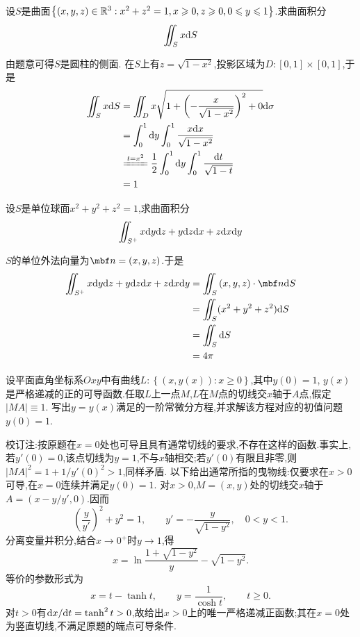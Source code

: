 \documentclass{ctexart}
\begin{document}
\begin{problem}[5.(10\songti{分})]
    设$S$是曲面$\left\{(x,y,z)\in\mathbb{R}^3:x^2+z^2=1,x\geqslant 0,z\geqslant 0,0\leqslant y\leqslant 1\right\}$.求曲面积分
    \[\iint_Sx\mathrm{d} S\]

\end{problem}
\begin{solution}
    由题意可得$S$是圆柱的侧面.
    在$S$上有$z=\sqrt{1-x^2}$,投影区域为$D:[0,1]\times[0,1]$,于是
    \[\begin{aligned}
        \iint_{S}x\di S
        &= \iint_{D}x\sqrt{1+\left(-\dfrac{x}{\sqrt{1-x^2}}\right)^2+0}\di\sigma \\
        &= \int_0^1\di y\int_0^1\dfrac{x\di x}{\sqrt{1-x^2}} \\
        &\xlongequal{t=x^2} \dfrac12\int_0^1\di y\int_0^1\dfrac{\di t}{\sqrt{1-t}} \\
        &= 1
    \end{aligned}\]
    
\end{solution}
\begin{problem}[6.(10\songti{分})]
    设$S$是单位球面$x^2+y^2+z^2=1$,求曲面积分
    \[\iint_{S^+}x\mathrm{d} y\mathrm{d} z+y\mathrm{d} z\mathrm{d} x+z\mathrm{d} x\mathrm{d} y\]

\end{problem}
\begin{solution}
    $S$的单位外法向量为$\mbf n=(x,y,z)$.于是
    \[\begin{aligned}
        \iint_{S^+}x\di y\di z+y\di z\di x+z\di x\di y
        &= \iint_S\left(x,y,z\right)\cdot\mbf n\di S \\
        &= \iint_S(x^2+y^2+z^2)\di S \\
        &= \iint_S\di S \\
        &= 4\pi
    \end{aligned}\]
\end{solution}
\begin{problem}[7.(15\songti{分})]
    设平面直角坐标系$Oxy$中有曲线$L:\left\{(x,y(x)):x\geqslant0\right\}$,其中$y(0)=1$,%
    $y(x)$是严格递减的正的可导函数.任取$L$上一点$M$,$L$在$M$点的切线交$x$轴于$A$点,假定$\left|MA\right|\equiv1$.%
    写出$y=y(x)$满足的一阶常微分方程,并求解该方程对应的初值问题$y(0)=1$.
\end{problem}
\begin{solution}
校订注:按原题在$x=0$处也可导且具有通常切线的要求,不存在这样的函数.事实上,若$y'(0)=0$,该点切线为$y=1$,不与$x$轴相交;若$y'(0)$有限且非零,则$|MA|^2=1+1/y'(0)^2>1$,同样矛盾.
    以下给出通常所指的曳物线:仅要求在$x>0$可导,在$x=0$连续并满足$y(0)=1$.
    对$x>0$,$M=(x,y)$处的切线交$x$轴于$A=(x-y/y',0)$.因而
    \[\left(\dfrac{y}{y'}\right)^2+y^2=1,\qquad
    y'=-\dfrac{y}{\sqrt{1-y^2}},\quad0<y<1.\]
    分离变量并积分,结合$x\to0^+$时$y\to1$,得
    \[x=\ln\dfrac{1+\sqrt{1-y^2}}{y}-\sqrt{1-y^2}.\]
    等价的参数形式为
    \[x=t-\tanh t,\qquad y=\dfrac1{\cosh t},\qquad t\geqslant0.\]
    对$t>0$有$\mathrm{d} x/\mathrm{d} t=\tanh^2t>0$,故给出$x>0$上的唯一严格递减正函数;其在$x=0$处为竖直切线,不满足原题的端点可导条件.
\end{solution}
\end{document}
